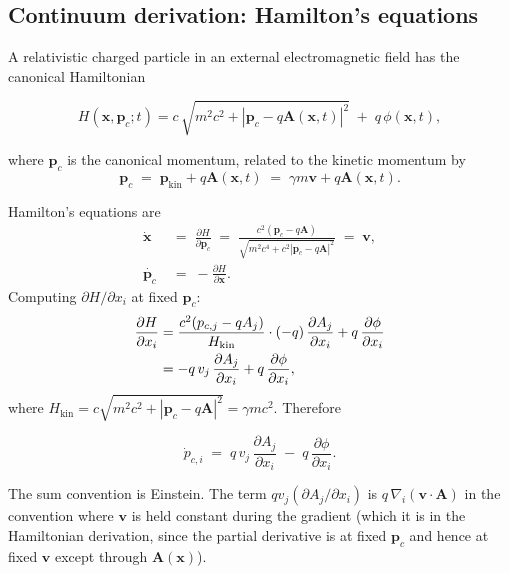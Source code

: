 \documentclass[11pt,a4paper]{article}
\newcommand{\vv}[1]{\mathbf{#1}}
\begin{document}
\subsection{Continuum derivation: Hamilton's equations}

A relativistic charged particle in an external electromagnetic
field has the canonical Hamiltonian
\begin{eqbox}
\begin{equation}
\label{eq:gempic_H}
H(\vv{x}, \vv{p}_c; t)
   = c\,\sqrt{m^2 c^2 + |\vv{p}_c - q\vv{A}(\vv{x}, t)|^2}
   \;+\; q\,\phi(\vv{x}, t),
\end{equation}
\end{eqbox}
where $\vv{p}_c$ is the canonical momentum, related to the
kinetic momentum by
\begin{equation}
\label{eq:gempic_pc_pkin}
\vv{p}_c \;=\; \vv{p}_{\mathrm{kin}} + q\vv{A}(\vv{x}, t)
       \;=\; \gamma m \vv{v} + q\vv{A}(\vv{x}, t).
\end{equation}

Hamilton's equations are
\begin{align}
\dot{\vv{x}} &\;=\; \frac{\partial H}{\partial \vv{p}_c}
              \;=\; \frac{c^2 (\vv{p}_c - q\vv{A})}{
                       \sqrt{m^2 c^4 + c^2|\vv{p}_c - q\vv{A}|^2}}
              \;=\; \vv{v},
              \label{eq:gempic_xdot}\\
\dot{\vv{p}_c} &\;=\; -\frac{\partial H}{\partial \vv{x}}.
              \label{eq:gempic_pcdot_abs}
\end{align}
Computing $\partial H/\partial x_i$ at fixed $\vv{p}_c$:
\begin{align}
\frac{\partial H}{\partial x_i}
  &= \frac{c^2 (p_{c,j} - qA_j)}{H_{\mathrm{kin}}} \cdot
     (-q)\,\frac{\partial A_j}{\partial x_i}
     + q\,\frac{\partial \phi}{\partial x_i}\notag\\
  &= -q\, v_j \, \frac{\partial A_j}{\partial x_i}
     + q\,\frac{\partial \phi}{\partial x_i},
\end{align}
where $H_{\mathrm{kin}} = c\sqrt{m^2 c^2 + |\vv{p}_c - q\vv{A}|^2}
                       = \gamma m c^2$.  Therefore
\begin{eqbox}
\begin{equation}
\label{eq:gempic_pcdot}
\dot{p}_{c,i} \;=\; q\, v_j \, \frac{\partial A_j}{\partial x_i}
                  \;-\; q\,\frac{\partial \phi}{\partial x_i}.
\end{equation}
\end{eqbox}
The sum convention is Einstein.  The term $q v_j (\partial A_j/\partial x_i)$
is $q\,\nabla_i(\vv{v}\cdot\vv{A})$ in the convention where $\vv{v}$
is held constant during the gradient (which it is in the Hamiltonian
derivation, since the partial derivative is at fixed $\vv{p}_c$ and
hence at fixed $\vv{v}$ except through $\vv{A}(\vv{x})$).
\end{document}
